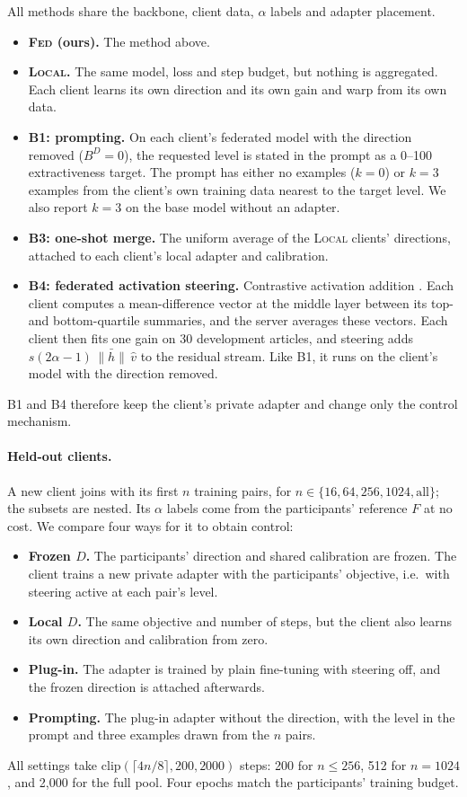 \documentclass[11pt]{article}
\newcommand{\fed}{\textsc{Fed}}
\newcommand{\loc}{\textsc{Local}}
\begin{document}
All methods share the backbone, client data, $\alpha$ labels and adapter placement.
\begin{itemize}
  \item \textbf{\fed{} (ours).} The method above.
  \item \textbf{\loc{}.} The same model, loss and step budget, but nothing is aggregated.
  Each client learns its own direction and its own gain and warp from its own data.
  \item \textbf{B1: prompting.} On each client's federated model with the direction removed ($B^{D}=0$), the requested level is stated in the prompt as a 0--100 extractiveness target.
  The prompt has either no examples ($k=0$) or $k=3$ examples from the client's own training data nearest to the target level.
  We also report $k=3$ on the base model without an adapter.
  \item \textbf{B3: one-shot merge.} The uniform average of the \loc{} clients' directions, attached to each client's local adapter and calibration.
  \item \textbf{B4: federated activation steering.} Contrastive activation addition \citep{rimsky-etal-2024-steering}.
  Each client computes a mean-difference vector at the middle layer between its top- and bottom-quartile summaries, and the server averages these vectors.
  Each client then fits one gain on 30 development articles, and steering adds $s(2\alpha-1)\,\bar{\lVert h\rVert}\,\hat v$ to the residual stream.
  Like B1, it runs on the client's model with the direction removed.
\end{itemize}
B1 and B4 therefore keep the client's private adapter and change only the control mechanism.

\paragraph{Held-out clients.}
A new client joins with its first $n$ training pairs, for $n\in\{16, 64, 256, 1024, \text{all}\}$; the subsets are nested.
Its $\alpha$ labels come from the participants' reference $F$ at no cost.
We compare four ways for it to obtain control:
\begin{itemize}
  \item \textbf{Frozen $D$.} The participants' direction and shared calibration are frozen. The client trains a new private adapter with the participants' objective, i.e.\ with steering active at each pair's level.
  \item \textbf{Local $D$.} The same objective and number of steps, but the client also learns its own direction and calibration from zero.
  \item \textbf{Plug-in.} The adapter is trained by plain fine-tuning with steering off, and the frozen direction is attached afterwards.
  \item \textbf{Prompting.} The plug-in adapter without the direction, with the level in the prompt and three examples drawn from the $n$ pairs.
\end{itemize}
All settings take $\mathrm{clip}(\lceil 4n/8\rceil, 200, 2000)$ steps: 200 for $n\le256$, 512 for $n=1024$, and 2{,}000 for the full pool.
Four epochs match the participants' training budget.
\end{document}

